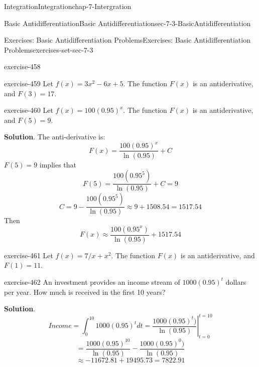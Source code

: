 \documentclass[oneside,10pt,]{book}
\numberwithin{equation}{section}
\begin{document}
\begin{chapterptx}{Integration}{}{Integration}{}{}{chap-7-Intergration}
\begin{sectionptx}{Basic Antidifferentiation}{}{Basic Antidifferentiation}{}{}{sec-7-3-BasicAntidifferentiation}
\begin{exercises-subsection-numberless}{Exercises: Basic Antidifferentiation Problems}{}{Exercises: Basic Antidifferentiation Problems}{}{}{exercises-set-sec-7-3}
\begin{divisionexercise}{13}{}{}{exercise-458}
\end{divisionexercise}%
\begin{divisionexercise}{14}{}{}{exercise-459}%
\hypertarget{p-2799}{}%
Let \(f(x)=3x^2-6x+5\).  The function \(F(x)\)  is an antiderivative, and \(F(3)=17\).%
\end{divisionexercise}%
\begin{divisionexercise}{15}{}{}{exercise-460}%
\hypertarget{p-2800}{}%
Let \(f(x)=100(0.95)^x\).  The function \(F(x)\)  is an antiderivative, and \(F(5)=9\).%
\par\smallskip%
\noindent\textbf{Solution}.\hypertarget{solution-233}{}\quad%
\hypertarget{p-2801}{}%
The anti-derivative is:%
%
\begin{equation*}
F(x)=\frac{100 (0.95)^x }{\ln(0.95)}   +C
\end{equation*}
\hypertarget{p-2802}{}%
\(F(5)= 9\) implies that%
%
\begin{equation*}
F(5)=\frac{100 (0.95^5 )}{\ln(0.95)} +C=9
\end{equation*}
%
\begin{equation*}
C=9-\frac{100 (0.95^5 )}{\ln(0.95)}\approx 9+1508.54=1517.54
\end{equation*}
\hypertarget{p-2803}{}%
Then%
%
\begin{equation*}
F(x)\approx\frac{100 (0.95^x )}{\ln(0.95)} +1517.54
\end{equation*}
\end{divisionexercise}%
\begin{divisionexercise}{16}{}{}{exercise-461}%
\hypertarget{p-2804}{}%
Let \(f(x)=7/x+x^2\).  The function \(F(x)\)  is an antiderivative, and \(F(1)=11\).%
\end{divisionexercise}%
\begin{divisionexercise}{17}{}{}{exercise-462}%
\hypertarget{p-2805}{}%
An investment provides an income stream of \(1000 (0.95)^t\) dollars per year.  How much is received in the first 10 years?%
\par\smallskip%
\noindent\textbf{Solution}.\hypertarget{solution-234}{}\quad%
%
\begin{equation*}
Income=\int_0^{10}1000(0.95)^t  dt
=\left.\frac{1000(0.95)^t)}{\ln(0.95)} \right|_{t=0}^{t=10}
\end{equation*}
%
\begin{equation*}
=\frac{1000(0.95)^{10}}{\ln(0.95)} -\frac{1000(0.95)^0)}{\ln(0.95)} 
\end{equation*}
%
\begin{equation*}
\approx -11672.81+19495.73=7822.91

\end{equation*}
\end{divisionexercise}
\end{exercises-subsection-numberless}
\end{sectionptx}
\end{chapterptx}
\end{document}
